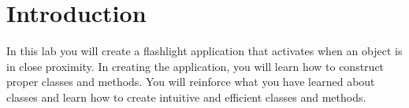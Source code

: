 \section{Introduction}

In this lab you will create a flashlight application that activates when an object is in close proximity.
In creating the application, you will learn how to construct proper classes and methods.
You will reinforce what you have learned about classes and learn how to create intuitive and efficient classes and methods.
